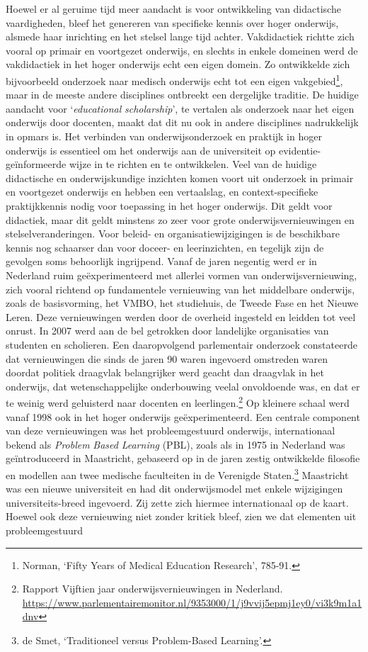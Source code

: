 \documentclass[smallauthor, chapterhaspagenum, nochapterinheader, pagenuminheader,  bigchapnum,medium2, tocpages, garamond, titleinheader]{jote-book}
\begin{document}
	Hoewel er al geruime tijd meer aandacht is voor ontwikkeling van didactische vaardigheden, bleef het genereren van specifieke kennis over hoger onderwijs, alsmede haar inrichting en het stelsel lange tijd achter. Vakdidactiek richtte zich vooral op primair en voortgezet onderwijs, en slechts in enkele domeinen werd de vakdidactiek in het hoger onderwijs echt een eigen domein. Zo ontwikkelde zich bijvoorbeeld onderzoek naar medisch onderwijs echt tot een eigen vakgebied\footnote{Norman, ‘Fifty Years of Medical Education Research', 785-91.}, maar in de meeste andere disciplines ontbreekt een dergelijke traditie. De huidige aandacht voor ‘\emph{educational}\emph{ }\emph{scholarship}', te vertalen als onderzoek naar het eigen onderwijs door docenten, maakt dat dit nu ook in andere disciplines nadrukkelijk in opmars is. Het verbinden van onderwijsonderzoek en praktijk in hoger onderwijs is essentieel om het onderwijs aan de universiteit op evidentie-geïnformeerde wijze in te richten en te ontwikkelen. Veel van de huidige didactische en onderwijskundige inzichten komen voort uit onderzoek in primair en voortgezet onderwijs en hebben een vertaalslag, en context-specifieke praktijkkennis nodig voor toepassing in het hoger onderwijs. Dit geldt voor didactiek, maar dit geldt minstens zo zeer voor grote onderwijsvernieuwingen en stelselveranderingen. Voor beleid- en organisatiewijzigingen is de beschikbare kennis nog schaarser dan voor doceer- en leerinzichten, en tegelijk zijn de gevolgen soms behoorlijk ingrijpend. Vanaf de jaren negentig werd er in Nederland ruim geëxperimenteerd met allerlei vormen van onderwijsvernieuwing, zich vooral richtend op fundamentele vernieuwing van het middelbare onderwijs, zoals de basisvorming, het VMBO, het studiehuis, de Tweede Fase en het Nieuwe Leren. Deze vernieuwingen werden door de overheid ingesteld en leidden tot veel onrust. In 2007 werd aan de bel getrokken door landelijke organisaties van studenten en scholieren. Een daaropvolgend parlementair onderzoek constateerde dat vernieuwingen die sinds de jaren 90 waren ingevoerd omstreden waren doordat politiek draagvlak belangrijker werd geacht dan draagvlak in het onderwijs, dat wetenschappelijke onderbouwing veelal onvoldoende was, en dat er te weinig werd geluisterd naar docenten en leerlingen.\footnote{Rapport Vijftien jaar onderwijsvernieuwingen in Nederland. \href{https://www.parlementairemonitor.nl/9353000/1/j9vvij5epmj1ey0/vi3k9m1a1dnv}{https://www.parlementairemonitor.nl/9353000/1/j9vvij5epmj1ey0/vi3k9m1a1dnv} } Op kleinere schaal werd vanaf 1998 ook in het hoger onderwijs geëxperimenteerd. Een centrale component van deze vernieuwingen was het probleemgestuurd onderwijs, internationaal bekend als \emph{Problem}\emph{ }\emph{Based}\emph{ Learning} (PBL), zoals als in 1975 in Nederland was geïntroduceerd in Maastricht, gebaseerd op in de jaren zestig ontwikkelde filosofie en modellen aan twee medische faculteiten in de Verenigde Staten.\footnote{de Smet, ‘Traditioneel versus Problem-Based Learning'.} Maastricht was een nieuwe universiteit en had dit onderwijsmodel met enkele wijzigingen universiteits-breed ingevoerd. Zij zette zich hiermee internationaal op de kaart. Hoewel ook deze vernieuwing niet zonder kritiek bleef, zien we dat elementen uit probleemgestuurd 
\end{document}
